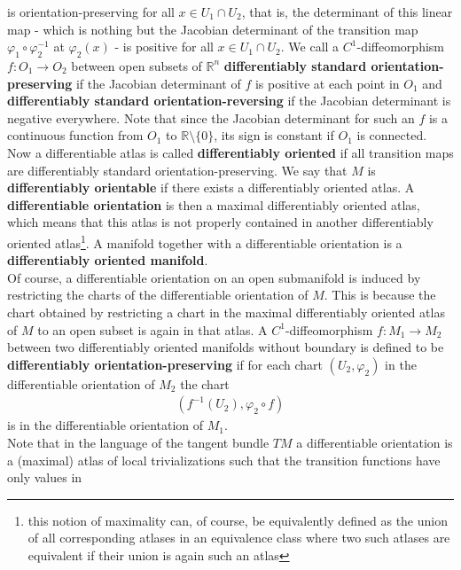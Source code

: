 is orientation-preserving for all $x \in U_{1} \cap U_{2}$, that is, the determinant of this linear map - which is nothing but the Jacobian determinant of the transition map $\varphi_{1} \circ \varphi_{2}^{-1}$ at $\varphi_{2}(x)$ - is positive for all $x \in U_{1} \cap U_{2}$. We call a $C^{1}$-diffeomorphism $f \colon O_{1} \to O_{2}$ between open subsets of $\mathbb{R}^{n}$ \textbf{differentiably standard orientation-preserving} if the Jacobian determinant of $f$ is positive at each point in $O_{1}$ and \textbf{differentiably standard orientation-reversing} if the Jacobian determinant is negative everywhere. Note that since the Jacobian determinant for such an $f$ is a continuous function from $O_{1}$ to $\mathbb{R} \setminus \lbrace 0 \rbrace$, its sign is constant if $O_{1}$ is connected. Now a differentiable atlas is called \textbf{differentiably oriented} if all transition maps are differentiably standard orientation-preserving. We say that $M$ is \textbf{differentiably orientable} if there exists a differentiably oriented atlas. A \textbf{differentiable orientation} is then a maximal differentiably oriented atlas, which means that this atlas is not properly contained in another differentiably oriented atlas\footnote{this notion of maximality can, of course, be equivalently defined as the union of all corresponding atlases in an equivalence class where two such atlases are equivalent if their union is again such an atlas}. A manifold together with a differentiable orientation is a \textbf{differentiably oriented manifold}.
\\
Of course, a differentiable orientation on an open submanifold is induced by restricting the charts of the differentiable orientation of $M$. This is because the chart obtained by restricting a chart in the maximal differentiably oriented atlas of $M$ to an open subset is again in that atlas. A $C^{1}$-diffeomorphism $f \colon M_{1} \to M_{2}$ between two differentiably oriented manifolds without boundary is defined to be \textbf{differentiably orientation-preserving} if for each chart $(U_{2},\varphi_{2})$ in the differentiable orientation of $M_{2}$ the chart
\begin{align*}
  \left(
    f^{-1}(U_{2})
    ,
    \varphi_{2}
    \circ
    f
  \right)
\end{align*}
is in the differentiable orientation of $M_{1}$.
\\
Note that in the language of the tangent bundle $TM$ a differentiable orientation is a (maximal) atlas of local trivializations such that the transition functions have only values in
